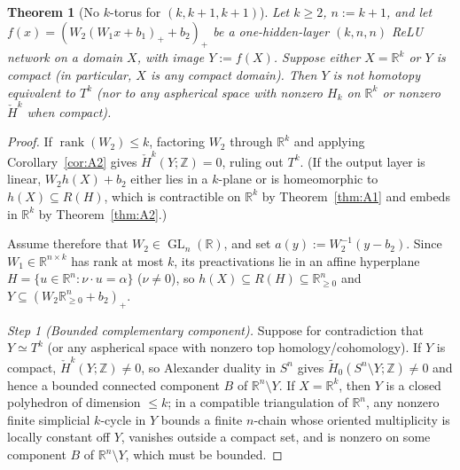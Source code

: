 \documentclass[11pt]{article}
\theoremstyle{plain}
\newtheorem{theorem}{Theorem}
\theoremstyle{definition}
\theoremstyle{remark}
\DeclareMathOperator{\rank}{rank}
\DeclareMathOperator{\GL}{GL}
\begin{document}
\begin{theorem}[No $k$-torus for $(k, k+1, k+1)$]\label{thm:B1}
Let $k \ge 2$, $n := k + 1$, and let $f(x) = (W_2 (W_1 x + b_1)_+ + b_2)_+$ be a one-hidden-layer $(k, n, n)$ ReLU network on a domain $X$, with image $Y := f(X)$. Suppose either $X = \mathbb{R}^k$ or $Y$ is compact (in particular, $X$ is any compact domain). Then $Y$ is not homotopy equivalent to $T^k$ (nor to any aspherical space with nonzero $H_k$ on $\mathbb{R}^k$ or nonzero $\check{H}^k$ when compact).
\end{theorem}

\begin{proof}
If $\rank(W_2) \le k$, factoring $W_2$ through $\mathbb{R}^k$ and applying Corollary~\ref{cor:A2} gives $\check{H}^k(Y; \mathbb{Z}) = 0$, ruling out $T^k$. (If the output layer is linear, $W_2 h(X) + b_2$ either lies in a $k$-plane or is homeomorphic to $h(X) \subseteq R(H)$, which is contractible on $\mathbb{R}^k$ by Theorem~\ref{thm:A1} and embeds in $\mathbb{R}^k$ by Theorem~\ref{thm:A2}.)

Assume therefore that $W_2 \in \GL_n(\mathbb{R})$, and set $a(y) := W_2^{-1}(y - b_2)$. Since $W_1 \in \mathbb{R}^{n \times k}$ has rank at most $k$, its preactivations lie in an affine hyperplane $H = \{u \in \mathbb{R}^n : \nu \cdot u = \alpha\}$ ($\nu \neq 0$), so $h(X) \subseteq R(H) \subseteq \mathbb{R}_{\ge 0}^n$ and $Y \subseteq (W_2 \mathbb{R}_{\ge 0}^n + b_2)_+$.

\emph{Step 1 (Bounded complementary component).} Suppose for contradiction that $Y \simeq T^k$ (or any aspherical space with nonzero top homology/cohomology). If $Y$ is compact, $\check{H}^k(Y; \mathbb{Z}) \neq 0$, so Alexander duality in $S^n$ gives $\tilde{H}_0(S^n \setminus Y; \mathbb{Z}) \neq 0$ and hence a bounded connected component $B$ of $\mathbb{R}^n \setminus Y$. If $X = \mathbb{R}^k$, then $Y$ is a closed polyhedron of dimension $\le k$; in a compatible triangulation of $\mathbb{R}^n$, any nonzero finite simplicial $k$-cycle in $Y$ bounds a finite $n$-chain whose oriented multiplicity is locally constant off $Y$, vanishes outside a compact set, and is nonzero on some component $B$ of $\mathbb{R}^n \setminus Y$, which must be bounded.


\end{proof}
\end{document}
